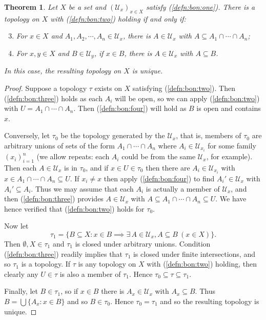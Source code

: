 \documentclass[a4paper,11pt]{article}
\newcommand{\mc}[1]{{\mathcal{#1}}}
\newtheorem{theorem}[lemma]{Theorem}
\begin{document}
\begin{theorem}
Let $X$ be a set and $(\mc U_x)_{x\in X}$ satisfy (\ref{defn:bon:one}).
There is a topology on $X$ with (\ref{defn:bon:two}) holding if and only if:
\begin{enumerate}\setcounter{enumi}{2}
\item\label{defn:bon:three}
For $x\in X$ and $A_1,A_2,\cdots,A_n\in\mc U_x$, there is $A\in \mc U_x$ with
  $A\subseteq A_1\cap\cdots\cap A_n$;
\item\label{defn:bon:four}
For $x,y\in X$ and $B\in\mc U_y$, if $x\in B$, there is $A\in\mc U_x$ with
  $A\subseteq B$.
\end{enumerate}
In this case, the resulting topology on $X$ is unique.
\end{theorem}
\begin{proof}
Suppose a topology $\tau$ exists on $X$ satisfying (\ref{defn:bon:two}).
Then (\ref{defn:bon:three}) holds as each $A_i$ will be open, so we can
apply (\ref{defn:bon:two}) with $U=A_1\cap\cdots\cap A_n$.  Then
(\ref{defn:bon:four}) will hold as $B$ is open and contains $x$.

Conversely, let $\tau_0$ be the topology generated by the $\mc U_x$, that is,
members of $\tau_0$ are arbitrary unions of sets of the form $A_1\cap\cdots\cap
A_n$ where $A_i\in\mc U_{x_i}$ for some family $(x_i)_{i=1}^n$ (we allow
repeats: each $A_i$ could be from the same $\mc U_x$, for example).  Then each
$A\in\mc U_x$ is in $\tau_0$, and if $x\in U\in\tau_0$ then there are
$A_i\in\mc U_{x_i}$ with $x\in A_1\cap\cdots\cap A_n\subseteq U$.  If
$x_i\not=x$ then apply (\ref{defn:bon:four}) to find $A_i'\in\mc U_x$ with
$A_i'\subseteq A_i$.  Thus we may assume that each $A_i$ is actually a member of
$\mc U_x$, and then (\ref{defn:bon:three}) provides $A\in\mc U_x$ with
$A\subseteq A_1\cap\cdots\cap A_n \subseteq U$.  We have hence verified that
(\ref{defn:bon:two}) holds for $\tau_0$.

Now let
\[ \tau_1 = \big\{ B\subseteq X : x\in B \implies \exists\, A\in\mc U_x,
A\subseteq B \ (x\in X) \big\}. \]
Then $\emptyset, X\in \tau_1$ and $\tau_1$ is closed under arbitrary unions.
Condition (\ref{defn:bon:three}) readily implies that $\tau_1$ is closed under
finite intersections, and so $\tau_1$ is a topology.  If $\tau$ is any topology
on $X$ with (\ref{defn:bon:two}) holding, then clearly any $U\in\tau$ is also a
member of $\tau_1$.  Hence $\tau_0 \subseteq \tau \subseteq \tau_1$.

Finally, let $B\in\tau_1$, so if $x\in B$ there is $A_x\in\mc U_x$ with $A_x
\subseteq B$.  Thus $B = \bigcup \{ A_x : x\in B \}$ and so $B\in\tau_0$.  Hence
$\tau_0 = \tau_1$ and so the resulting topology is unique.
\end{proof}
\end{document}
